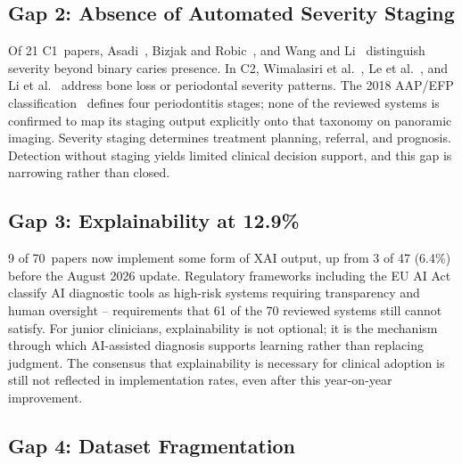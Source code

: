 \documentclass[conference]{IEEEtran}
\begin{document}
\subsection{Gap 2: Absence of Automated Severity Staging}

Of 21 C1~papers, Asadi~\cite{asadi2024detection}, Bizjak and
Robic~\cite{bizjak2024advancing}, and Wang and Li~\cite{wang2026transformer}
distinguish severity beyond binary caries presence. In C2, Wimalasiri
et al.~\cite{wimalasiri2025ai}, Le et al.~\cite{le2026automated}, and
Li et al.~\cite{li2025novel} address bone loss or periodontal severity
patterns. The 2018 AAP/EFP classification~\cite{chmielewski20252018}
defines four periodontitis stages; none of the reviewed systems is
confirmed to map its staging output explicitly onto that taxonomy on
panoramic imaging. Severity staging determines treatment planning,
referral, and prognosis. Detection without staging yields limited
clinical decision support, and this gap is narrowing rather than
closed.

\subsection{Gap 3: Explainability at 12.9\%}

9 of 70~papers now implement some form of XAI output, up from 3 of 47
(6.4\%) before the August 2026 update. Regulatory
frameworks including the EU AI Act classify AI diagnostic tools as
high-risk systems requiring transparency and human oversight --
requirements that 61 of the 70 reviewed systems still cannot satisfy.
For junior clinicians, explainability is not optional; it is the
mechanism through which AI-assisted diagnosis supports learning rather
than replacing judgment. The consensus that explainability is
necessary for clinical adoption
\cite{nassiri2025yolo,gamal2025automated,sastika2025ai,ferrara2025applications}
is still not reflected in implementation rates, even after this
year-on-year improvement.

\subsection{Gap 4: Dataset Fragmentation}
\end{document}
